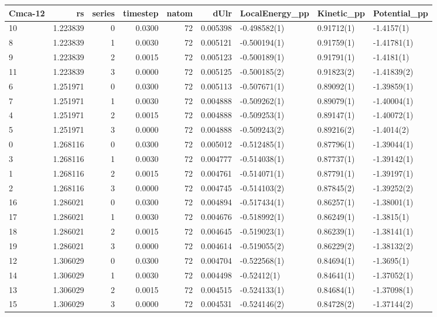 \begin{tabular}{lrrrrrlll}
\toprule
Cmca-12 &        rs &  series &  timestep &  natom &      dUlr & LocalEnergy\_pp &  Kinetic\_pp & Potential\_pp \\
\midrule
10 &  1.223839 &       0 &    0.0300 &     72 &  0.005398 &   -0.498582(1) &  0.91712(1) &   -1.4157(1) \\
8  &  1.223839 &       1 &    0.0030 &     72 &  0.005121 &   -0.500194(1) &  0.91759(1) &  -1.41781(1) \\
9  &  1.223839 &       2 &    0.0015 &     72 &  0.005123 &   -0.500189(1) &  0.91791(1) &   -1.4181(1) \\
11 &  1.223839 &       3 &    0.0000 &     72 &  0.005125 &   -0.500185(2) &  0.91823(2) &  -1.41839(2) \\
6  &  1.251971 &       0 &    0.0300 &     72 &  0.005113 &   -0.507671(1) &  0.89092(1) &  -1.39859(1) \\
7  &  1.251971 &       1 &    0.0030 &     72 &  0.004888 &   -0.509262(1) &  0.89079(1) &  -1.40004(1) \\
4  &  1.251971 &       2 &    0.0015 &     72 &  0.004888 &   -0.509253(1) &  0.89147(1) &  -1.40072(1) \\
5  &  1.251971 &       3 &    0.0000 &     72 &  0.004888 &   -0.509243(2) &  0.89216(2) &   -1.4014(2) \\
0  &  1.268116 &       0 &    0.0300 &     72 &  0.005012 &   -0.512485(1) &  0.87796(1) &  -1.39044(1) \\
3  &  1.268116 &       1 &    0.0030 &     72 &  0.004777 &   -0.514038(1) &  0.87737(1) &  -1.39142(1) \\
1  &  1.268116 &       2 &    0.0015 &     72 &  0.004761 &   -0.514071(1) &  0.87791(1) &  -1.39197(1) \\
2  &  1.268116 &       3 &    0.0000 &     72 &  0.004745 &   -0.514103(2) &  0.87845(2) &  -1.39252(2) \\
16 &  1.286021 &       0 &    0.0300 &     72 &  0.004894 &   -0.517434(1) &  0.86257(1) &  -1.38001(1) \\
17 &  1.286021 &       1 &    0.0030 &     72 &  0.004676 &   -0.518992(1) &  0.86249(1) &   -1.3815(1) \\
18 &  1.286021 &       2 &    0.0015 &     72 &  0.004645 &   -0.519023(1) &  0.86239(1) &  -1.38141(1) \\
19 &  1.286021 &       3 &    0.0000 &     72 &  0.004614 &   -0.519055(2) &  0.86229(2) &  -1.38132(2) \\
12 &  1.306029 &       0 &    0.0300 &     72 &  0.004704 &   -0.522568(1) &  0.84694(1) &   -1.3695(1) \\
14 &  1.306029 &       1 &    0.0030 &     72 &  0.004498 &    -0.52412(1) &  0.84641(1) &  -1.37052(1) \\
13 &  1.306029 &       2 &    0.0015 &     72 &  0.004515 &   -0.524133(1) &  0.84684(1) &  -1.37098(1) \\
15 &  1.306029 &       3 &    0.0000 &     72 &  0.004531 &   -0.524146(2) &  0.84728(2) &  -1.37144(2) \\
\bottomrule
\end{tabular}
